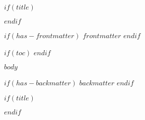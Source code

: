 \documentclass[11pt,letterpaper,twoside,titlepage]{scrreprt}
\begin{document}
$if(title)$

$endif$

\frontmatter

$if(has-frontmatter)$
$frontmatter$
$endif$

$if(toc)$
\cleardoublepage
\tableofcontents
$endif$

\mainmatter

$body$

\backmatter

$if(has-backmatter)$
$backmatter$
$endif$

$if(title)$

$endif$
\end{document}
